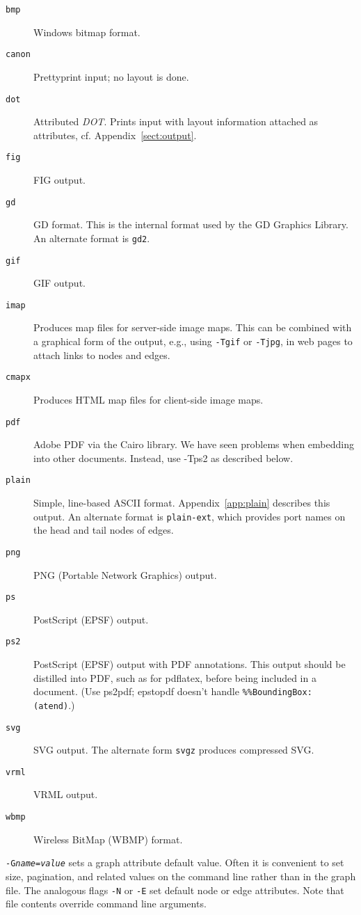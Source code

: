 \documentclass[11pt]{article}
\def\DOT{{\it DOT}}
\begin{document}
{\begin{description}
\item[{\tt bmp}] Windows bitmap format.
\item[{\tt canon}]
Prettyprint input; no layout is done.
\item[{\tt dot}] 
Attributed \DOT. Prints input with layout information attached as
attributes, cf. Appendix~\ref{sect:output}.
\item[{\tt fig}] FIG output.
\item[{\tt gd}] GD format. This is the internal format used by the GD Graphics
Library. An alternate format is {\tt gd2}.
\item[{\tt gif}] GIF output.
\item[{\tt imap}] Produces map files for server-side image 
maps. This can be combined with a graphical form of the output, e.g., using
{\tt -Tgif} or {\tt -Tjpg}, in web pages to attach links to nodes and edges. 
\item[{\tt cmapx}] Produces HTML map files for client-side image maps.
\item[{\tt pdf}] Adobe PDF via the Cairo library. We have seen problems when embedding into other documents. Instead, use -Tps2 as described below.
\item[{\tt plain}] Simple, line-based ASCII format. Appendix~\ref{app:plain}
describes this output. An alternate format is {\tt plain-ext}, which 
provides port names on the head and tail nodes of edges.
\item[{\tt png}] PNG (Portable Network Graphics) output.
\item[{\tt ps}] PostScript (EPSF) output.
\item[{\tt ps2}] PostScript (EPSF) output with PDF annotations. This output should be distilled into PDF, such as for pdflatex, before being included in 
a document. (Use ps2pdf; epstopdf doesn't handle \verb"%%BoundingBox: (atend)".)
\item[{\tt svg}] SVG output. The alternate form {\tt svgz} produces
compressed SVG.
\item[{\tt vrml}] VRML output.
\item[{\tt wbmp}] Wireless BitMap (WBMP) format.
\end{description}

{\tt-G{\it name}={\it value}} sets a graph attribute default value.
Often it is convenient to set size, pagination, and related
values on the command line rather than in the graph file.
The analogous flags \verb"-N" or \verb"-E" 
set default node or edge attributes.
Note that file contents override command line arguments.

}
\end{document}
